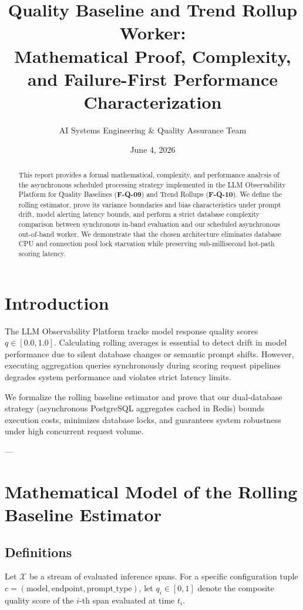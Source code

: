 \documentclass[10pt]{article}
\begin{document}
\title{\textbf{Quality Baseline and Trend Rollup Worker:\\Mathematical Proof, Complexity, and Failure-First Performance Characterization}}
\author{AI Systems Engineering \& Quality Assurance Team}
\date{June 4, 2026}
\maketitle

\begin{abstract}
This report provides a formal mathematical, complexity, and performance analysis of the asynchronous scheduled processing strategy implemented in the LLM Observability Platform for Quality Baselines (\textbf{F-Q-09}) and Trend Rollups (\textbf{F-Q-10}). We define the rolling estimator, prove its variance boundaries and bias characteristics under prompt drift, model alerting latency bounds, and perform a strict database complexity comparison between synchronous in-band evaluation and our scheduled asynchronous out-of-band worker. We demonstrate that the chosen architecture eliminates database CPU and connection pool lock starvation while preserving sub-millisecond hot-path scoring latency.
\end{abstract}

\section{Introduction}
The LLM Observability Platform tracks model response quality scores $q \in [0.0, 1.0]$. Calculating rolling averages is essential to detect drift in model performance due to silent database changes or semantic prompt shifts. However, executing aggregation queries synchronously during scoring request pipelines degrades system performance and violates strict latency limits. 

We formalize the rolling baseline estimator and prove that our dual-database strategy (asynchronous PostgreSQL aggregates cached in Redis) bounds execution costs, minimizes database locks, and guarantees system robustness under high concurrent request volume.

---

\section{Mathematical Model of the Rolling Baseline Estimator}

\subsection{Definitions}
Let $\mathcal{X}$ be a stream of evaluated inference spans. For a specific configuration tuple $c = (\text{model}, \text{endpoint}, \text{prompt\_type})$, let $q_i \in [0, 1]$ denote the composite quality score of the $i$-th span evaluated at time $t_i$.
\end{document}
